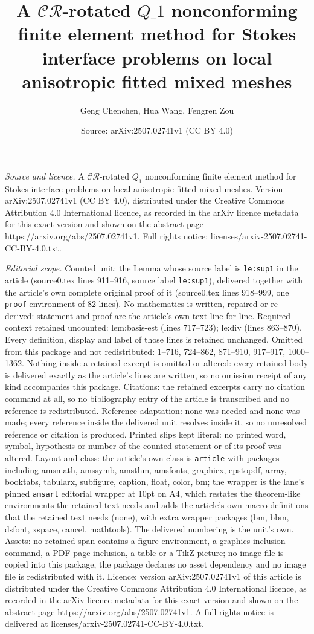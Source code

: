 \documentclass[10pt,a4paper]{amsart}
\title[A $\mathcal{CR}$-rotated $Q\_1$ nonconforming finite element ]{A $\mathcal{CR}$-rotated $Q\_1$ nonconforming finite element method for Stokes interface problems on local anisotropic fitted mixed meshes}
\author{Geng Chenchen, Hua Wang, Fengren Zou}
\date{Source: arXiv:2507.02741v1 (CC BY 4.0)}
\begin{document}
\maketitle

\noindent\emph{Source and licence.} A $\mathcal{CR}$-rotated $Q_1$ nonconforming finite element method for Stokes interface problems on local anisotropic fitted mixed meshes. Version arXiv:2507.02741v1 (CC BY 4.0), distributed under the Creative Commons Attribution 4.0 International licence, as recorded in the arXiv licence metadata for this exact version and shown on the abstract page https://arxiv.org/abs/2507.02741v1. Full rights notice: licenses/arxiv-2507.02741-CC-BY-4.0.txt.\par\smallskip

\noindent\textit{Editorial scope.} Counted unit: the Lemma whose source label is \texttt{le:sup1} in the article (source0.tex lines 911--916, source label \texttt{le:sup1}), delivered together with the article's own complete original proof of it (source0.tex lines 918--999, one \texttt{proof} environment of 82 lines). No mathematics is written, repaired or re-derived: statement and proof are the article's own text line for line. Required context retained uncounted: lem:basis-est (lines 717--723); le:div (lines 863--870). Every definition, display and label of those lines is retained unchanged. Omitted from this package and not redistributed: 1--716, 724--862, 871--910, 917--917, 1000--1362. Nothing inside a retained excerpt is omitted or altered: every retained body is delivered exactly as the article's lines are written, so no omission receipt of any kind accompanies this package. Citations: the retained excerpts carry no citation command at all, so no bibliography entry of the article is transcribed and no reference is redistributed. Reference adaptation: none was needed and none was made; every reference inside the delivered unit resolves inside it, so no unresolved reference or citation is produced. Printed slips kept literal: no printed word, symbol, hypothesis or number of the counted statement or of its proof was altered. Layout and class: the article's own class is \texttt{article} with packages including amsmath, amssymb, amsthm, amsfonts, graphicx, epstopdf, array, booktabs, tabularx, subfigure, caption, float, color, bm; the wrapper is the lane's pinned \texttt{amsart} editorial wrapper at 10pt on A4, which restates the theorem-like environments the retained text needs and adds the article's own macro definitions that the retained text needs (none), with extra wrapper packages (bm, bbm, dsfont, xspace, cancel, mathtools). The delivered numbering is the unit's own. Assets: no retained span contains a figure environment, a graphics-inclusion command, a PDF-page inclusion, a table or a TikZ picture; no image file is copied into this package, the package declares no asset dependency and no image file is redistributed with it. Licence: version arXiv:2507.02741v1 of this article is distributed under the Creative Commons Attribution 4.0 International licence, as recorded in the arXiv licence metadata for this exact version and shown on the abstract page https://arxiv.org/abs/2507.02741v1. A full rights notice is delivered at licenses/arxiv-2507.02741-CC-BY-4.0.txt. 
\end{document}
